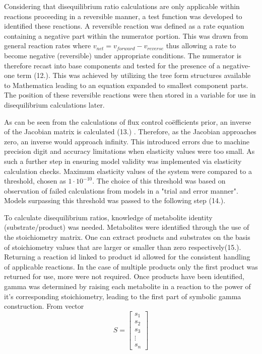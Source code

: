 Considering that disequilibrium ratio calculations are only applicable within reactions proceeding in a reversible manner, a test function was developed to identified these reactions. A reversible reaction was defined as a rate equation containing a negative part within the numerator portion. This was drawn from general reaction rates where $v_{net} = v_{forward} - v_{reverse}$ thus allowing a rate to become negative (reversible) under appropriate conditions. The numerator is therefore recast into base components and tested for the presence of a negative-one term (12.). This was achieved by utilizing the tree form structures available to Mathematica leading to an equation expanded to smallest component parts. The position of these reversible reactions were then stored in a variable for use in disequilibrium calculations later. 

As can be seen from the calculations of flux control co\"efficients prior, an inverse of the Jacobian matrix is calculated (13.) \citeauthor{Hofmeyr2001}. Therefore, as the Jacobian approaches zero, an inverse would approach infinity. This introduced errors due to machine precision digit and accuracy limitations when elasticity values were too small. As such a further step in ensuring model validity was implemented via elasticity calculation checks. Maximum elasticity values of the system were compared to a threshold, chosen as $1 \cdot 10^{-10}$. The choice of this threshold was based on observation of failed calculations from models in a "trial and error manner".  Models surpassing this threshold was passed to the following step (14.). 

To calculate disequilibrium ratios, knowledge of metabolite identity (substrate/product) was needed. Metabolites were identified through the use of the stoichiometry matrix. One can extract products and substrates on the basis of stoichiometry values that are larger or smaller than zero respectively(15.). Returning a reaction id linked to product id allowed for the consistent handling of applicable reactions. In the case of multiple products only the first product was returned for use, more were not required. Once products have been identified, gamma was determined by raising each metabolite in a reaction to the power of it's corresponding stoichiometry, leading to the first part of symbolic gamma construction. From vector 
\[
S
=
\begin{bmatrix}
    s_{1} \\
    s_{2} \\
    s_{3} \\
    \vdots \\
    s_{n} 
\end{bmatrix}
\]

